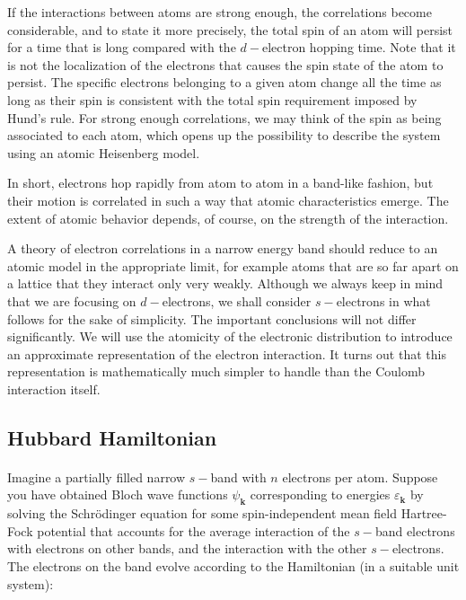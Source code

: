 \documentclass[10pt, twocolumn, twoside]{article}
\begin{document}
If the interactions between atoms are strong enough, the correlations become considerable, and to state it more precisely, the total spin of an atom will persist for a time that is long compared with the $d-$electron hopping time. Note that it is not the localization of the electrons that causes the spin state of the atom to persist. The specific electrons belonging to a given atom change all the time as long as their spin is consistent with the total spin requirement imposed by Hund's rule. For strong enough correlations, we may think of the spin as being associated to each atom, which opens up the possibility to describe the system using an atomic Heisenberg model.

In short, electrons hop rapidly from atom to atom in a band-like fashion, but their motion is correlated in such a way that atomic characteristics emerge. The extent of atomic behavior depends, of course, on the strength of the interaction.

A theory of electron correlations in a narrow energy band should reduce to an atomic model in the appropriate limit, for example atoms that are so far apart on a lattice that they interact only very weakly. Although we always keep in mind that we are focusing on $d-$electrons, we shall consider $s-$electrons in what follows for the sake of simplicity. The important conclusions will not differ significantly. We will use the atomicity of the electronic distribution to introduce an approximate representation of the electron interaction. It turns out that this representation is mathematically much simpler to handle than the Coulomb interaction itself.

\subsection{Hubbard Hamiltonian}\label{hubbardHamiltonian}\paragraph{}

Imagine a partially filled narrow $s-$band with $n$ electrons per atom. Suppose you have obtained Bloch wave functions $\psi_{\bm k}$ corresponding to energies $\varepsilon_{\bm k}$ by solving the Schr\"odinger equation for some spin-independent mean field Hartree-Fock potential that accounts for the average interaction of the $s-$band electrons with electrons on other bands, and the interaction with the other $s-$electrons. The electrons on the band evolve according to the Hamiltonian (in a suitable unit system):
\end{document}
